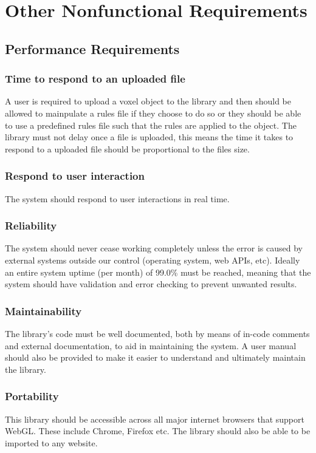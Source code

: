 \documentclass[english]{article}
\begin{document}
	\pagebreak
	
	\section{Other Nonfunctional Requirements}
	
		\subsection{Performance Requirements}
		\subsubsection {Time to respond to an uploaded file}
		A user is required to upload a voxel object to the library and then should be allowed to mainpulate a rules file if they choose to do so or they should be able to use a predefined rules file such that the rules are applied to the object. The library must not delay once a file is uploaded, this means the time it takes to respond to a uploaded file should be proportional to the files size.
		
		\subsubsection{Respond to user interaction}
		The system should respond to user interactions in real time.
		
		\subsubsection{Reliability}
		The system should never cease working completely unless the error is caused by external systems outside our control (operating system, web APIs, etc). Ideally an entire system uptime (per month) of 99.0\% must be reached, meaning that the system should have validation and error checking to prevent unwanted results.
		
		\subsubsection{Maintainability}
		The library's code must be well documented, both by means of in-code comments and external documentation, to aid in 
		maintaining the system. A user manual should also be provided to make it easier to understand and ultimately maintain the library.
		
		\subsubsection{Portability}
		This library should be accessible across all major internet browsers that support WebGL. These include Chrome, Firefox etc.
		The library should also be able to be imported to any website.
		
\end{document}
